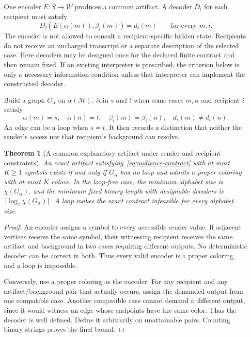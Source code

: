 \documentclass[11pt,letterpaper]{article}
\theoremstyle{plain}
\newtheorem{theorem}{Theorem}[section]
\theoremstyle{definition}
\newcommand{\M}{\mathcal M}\newcommand{\E}{\mathbb E}
\begin{document}
One encoder $E:S\to W$ produces a common artifact. A decoder $D_i$ for each recipient must satisfy
\begin{equation}\label{eq:audience-contract}
D_i(E(\alpha(m)),\beta_i(m))=d_i(m)\qquad\text{for every }m,i.
\end{equation}
The encoder is not allowed to consult a recipient-specific hidden state. Recipients do not receive an uncharged transcript or a separate description of the selected case. Here decoders may be designed once for the declared finite contract and then remain fixed. If an existing interpreter is prescribed, the criterion below is only a necessary information condition unless that interpreter can implement the constructed decoder.

Build a graph $G_\alpha$ on $\alpha(\M)$. Join $s$ and $t$ when some cases $m,n$ and recipient $i$ satisfy
\[
\alpha(m)=s,\quad\alpha(n)=t,\quad
\beta_i(m)=\beta_i(n),\quad d_i(m)\ne d_i(n).
\]
An edge can be a loop when $s=t$. It then records a distinction that neither the sender's access nor that recipient's background can resolve.

\begin{theorem}[A common explanatory artifact under sender and recipient constraints]\label{thm:audience}
An exact artifact satisfying~\eqref{eq:audience-contract} with at most $K\geq1$ symbols exists if and only if $G_\alpha$ has no loop and admits a proper coloring with at most $K$ colors. In the loop-free case, the minimum alphabet size is $\chi(G_\alpha)$, and the minimum fixed binary length with designable decoders is $\lceil\log_2\chi(G_\alpha)\rceil$. A loop makes the exact contract infeasible for every alphabet size.
\end{theorem}
\begin{proof}
An encoder assigns a symbol to every accessible sender value. If adjacent vertices receive the same symbol, their witnessing recipient receives the same artifact and background in two cases requiring different outputs. No deterministic decoder can be correct in both. Thus every valid encoder is a proper coloring, and a loop is impossible.

Conversely, use a proper coloring as the encoder. For any recipient and any artifact/background pair that actually occurs, assign the demanded output from one compatible case. Another compatible case cannot demand a different output, since it would witness an edge whose endpoints have the same color. Thus the decoder is well defined. Define it arbitrarily on unattainable pairs. Counting binary strings proves the final bound.
\end{proof}
\end{document}
